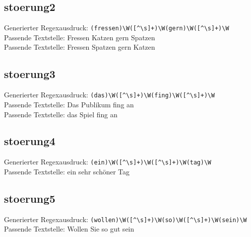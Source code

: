 \subsection{stoerung2}\label{subsec:stoerung2}
Generierter Regexausdruck: \verb/(fressen)\W([^\s]+)\W(gern)\W([^\s]+)\W/ \\
Passende Textstelle: Fressen Katzen gern Spatzen \\
Passende Textstelle: Fressen Spatzen gern Katzen

\subsection{stoerung3}\label{subsec:stoerung3}
Generierter Regexausdruck: \verb/(das)\W([^\s]+)\W(fing)\W([^\s]+)\W/ \\
Passende Textstelle: Das Publikum fing an \\
Passende Textstelle: das Spiel fing an

\subsection{stoerung4}\label{subsec:stoerung4}
Generierter Regexausdruck: \verb/(ein)\W([^\s]+)\W([^\s]+)\W(tag)\W/ \\
Passende Textstelle: ein sehr schöner Tag

\subsection{stoerung5}\label{subsec:stoerung5}
Generierter Regexausdruck: \verb/(wollen)\W([^\s]+)\W(so)\W([^\s]+)\W(sein)\W/ \\
Passende Textstelle: Wollen Sie so gut sein


